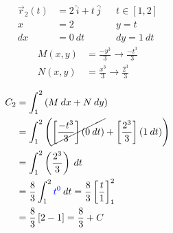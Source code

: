 \documentclass{article}
\begin{document}
\begin{center}
\noindent\begin{minipage}{0.4\linewidth}
    \begin{equation*}
    \begin{aligned}
        \vec{r}_2(t) &= 2\:\hat{i} + t\:\hat{j} && t \in \left[1, 2\right] \\
        x &= 2 && y = t \\
        dx &= 0\:dt && dy = 1\:dt
    \end{aligned}
    \end{equation*}
    \begin{equation*}
    \begin{aligned}
        M(x,y) &= \frac{-y^3}{3} \to \frac{-t^3}{3} \\
        N(x,y) &= \frac{x^3}{3} \to \frac{2^3}{3}
    \end{aligned}
    \end{equation*}
\end{minipage}
\begin{minipage}{0.4\linewidth}
    \begin{equation*}
    \begin{aligned}
        C_2 &= \int_1^2{\left( M\:dx + N\:dy\right)} \\
        &= \int_1^2{\left( \cancel{\left[\frac{-t^3}{3}\right] \left(0\:dt\right)} + \left[\frac{2^3}{3}\right]\left(1\:dt\right)\right)} \\
        &= \int_1^2{\left(\frac{2^3}{3}\right) \: dt} \\
        &= \frac{8}{3}\int_1^2{\textcolor{blue}{t^0}\:dt} = \frac{8}{3}\left[\frac{t}{1}\right]_1^2 \\
        &= \frac{8}{3}\left[2 - 1\right] = \frac{8}{3} + C
    \end{aligned}
    \end{equation*}
\end{minipage}
\end{center}
\end{document}

